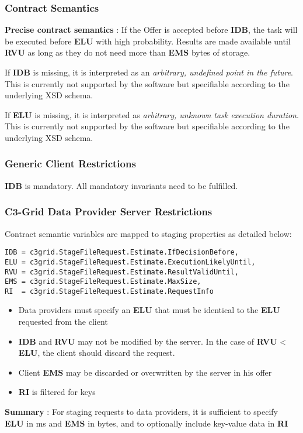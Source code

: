 \documentclass{article}
\begin{document}
\subsubsection{Contract Semantics}

\textbf{Precise contract semantics} : If the Offer is accepted
before \textbf{IDB}, the task will be executed before \textbf{ELU}
with high probability. Results are made available until
\textbf{RVU} as long as they do not need more than \textbf{EMS}
bytes of storage.

If \textbf{IDB} is missing, it is interpreted as an
\emph{arbitrary, undefined point in the future}. This is currently
not supported by the software but specifiable according to the
underlying XSD schema.

If \textbf{ELU} is missing, it is interpreted as
\emph{arbitrary, unknown task execution duration}. This is
currently not supported by the software but specifiable according
to the underlying XSD schema.

\subsubsection{Generic Client Restrictions}

\textbf{IDB} is mandatory. All mandatory invariants need to be
fulfilled.

\subsubsection{C3-Grid Data Provider Server Restrictions}

Contract semantic variables are mapped to staging properties as
detailed below:

\begin{verbatim}
IDB = c3grid.StageFileRequest.Estimate.IfDecisionBefore, 
ELU = c3grid.StageFileRequest.Estimate.ExecutionLikelyUntil, 
RVU = c3grid.StageFileRequest.Estimate.ResultValidUntil, 
EMS = c3grid.StageFileRequest.Estimate.MaxSize, 
RI  = c3grid.StageFileRequest.Estimate.RequestInfo
\end{verbatim}
\begin{itemize}
\item
  Data providers must specify an \textbf{ELU} that must be identical
  to the \textbf{ELU} requested from the client
\item
  \textbf{IDB} and \textbf{RVU} may not be modified by the server. In
  the case of \textbf{RVU} \textless{} \textbf{ELU}, the client
  should discard the request.
\item
  Client \textbf{EMS} may be discarded or overwritten by the server
  in his offer
\item
  \textbf{RI} is filtered for keys
\end{itemize}
\textbf{Summary} : For staging requests to data providers, it is
sufficient to specify \textbf{ELU} in ms and \textbf{EMS} in bytes,
and to optionally include key-value data in \textbf{RI}
\end{document}
